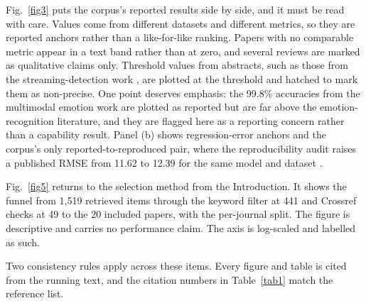 \documentclass[pdflatex,sn-basic,Numbered]{sn-jnl}%
\begin{document}
Fig.~\ref{fig3} puts the corpus's reported results side by side, and it must be read with care. Values come from different datasets and different metrics, so they are reported anchors rather than a like-for-like ranking. Papers with no comparable metric appear in a text band rather than at zero, and several reviews are marked as qualitative claims only. Threshold values from abstracts, such as those from the streaming-detection work \citep{gunbilek2026enhanced}, are plotted at the threshold and hatched to mark them as non-precise. One point deserves emphasis: the 99.8\% accuracies from the multimodal emotion work \citep{wafa2025advancing} are plotted as reported but are far above the emotion-recognition literature, and they are flagged here as a reporting concern rather than a capability result. Panel (b) shows regression-error anchors and the corpus's only reported-to-reproduced pair, where the reproducibility audit raises a published RMSE from 11.62 to 12.39 for the same model and dataset \citep{vats2026survey}.

Fig.~\ref{fig5} returns to the selection method from the Introduction. It shows the funnel from 1{,}519 retrieved items through the keyword filter at 441 and Crossref checks at 49 to the 20 included papers, with the per-journal split. The figure is descriptive and carries no performance claim. The axis is log-scaled and labelled as such.

Two consistency rules apply across these items. Every figure and table is cited from the running text, and the citation numbers in Table~\ref{tab1} match the reference list.
\end{document}
